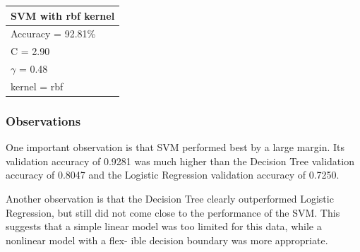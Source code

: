 \documentclass[12pt]{fphw}
\begin{document}
\begin{problem}
	\bigskip
    
	\begin{center}
		\begin{tabular}{l}
			\toprule
			SVM with rbf kernel \\
			\midrule
            Accuracy = 92.81\%\\
			C = 2.90\\
			$\gamma$ = 0.48\\
			kernel = rbf\\
			\bottomrule
		\end{tabular}
	\end{center}
	
	\medskip
\end{problem}

\subsubsection*{Observations}
One important observation is that SVM performed best by a large margin. Its validation accuracy of 0.9281 was much higher than the Decision Tree validation accuracy
of 0.8047 and the Logistic Regression validation accuracy of 0.7250.

Another observation is that the Decision Tree clearly outperformed Logistic Regression, but still did not come close to the performance of the SVM. This suggests that a
simple linear model was too limited for this data, while a nonlinear model with a flex-
ible decision boundary was more appropriate.
\end{document}
